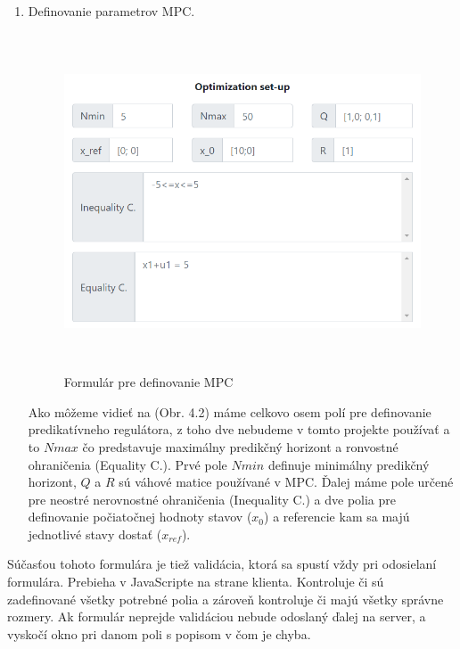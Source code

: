 \begin{enumerate}
{}
\item {Definovanie parametrov MPC.
\begin{figure}[H]	
	\centering
	\includegraphics[width=13cm,height=10cm]{images/MPC_setup}
	\caption{Formulár pre definovanie MPC}
\end{figure}
Ako môžeme vidieť na (Obr. 4.2) máme celkovo osem polí pre definovanie predikatívneho regulátora, z toho dve nebudeme v tomto projekte používať a to $Nmax$ čo predstavuje maximálny predikčný horizont a ronvostné ohraničenia (Equality C.). Prvé pole $Nmin$ definuje minimálny predikčný horizont, $Q$ a $R$ sú váhové matice používané v MPC. Ďalej máme pole určené pre neostré nerovnostné ohraničenia (Inequality C.) a dve polia pre definovanie počiatočnej hodnoty stavov ($x_{0}$) a referencie kam sa majú jednotlivé stavy dostať ($x_{ref}$).
}
\end{enumerate}
Súčasťou tohoto formulára je tiež validácia, ktorá sa spustí vždy pri odosielaní formulára. Prebieha v JavaScripte na strane klienta. Kontroluje či sú zadefinované všetky potrebné polia a zároveň kontroluje či majú všetky správne rozmery. Ak formulár neprejde validáciou nebude odoslaný ďalej na server, a vyskočí okno pri danom poli s popisom v čom je chyba.

